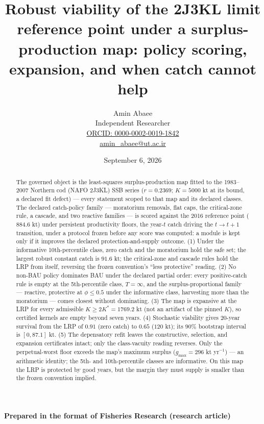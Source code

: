 \documentclass[11pt]{article}
\begin{document}
\title{Robust viability of the 2J3KL limit reference point under a surplus-production map: policy scoring, expansion, and when catch cannot help}
\author{Amin Abaee\\[0.35em]
{\small Independent Researcher}\\[0.55em]
{\small\href{https://orcid.org/0000-0002-0019-1842}{ORCID: 0000-0002-0019-1842}}\\[0.3em]
{\small\href{mailto:amin\_abaee@ut.ac.ir}{amin\_abaee@ut.ac.ir}}}
\date{September 6, 2026}
\maketitle

{\centering\small \textbf{Prepared in the format of Fisheries Research (research article)}\par}

\begin{abstract}


The governed object is the least-squares surplus-production map fitted
to the 1983--2007 Northern cod (NAFO 2J3KL) SSB series (\(r = 0.2369\);
\(K = 5000\) kt at its bound, a declared fit defect) --- every statement
scoped to that map and its declared classes. The declared catch-policy
family --- moratorium removals, flat caps, the critical-zone rule, a
cascade, and two reactive families --- is scored against the 2016
reference point (\(884.6\) kt) under persistent productivity floors, the
year-\(t\) catch driving the \(t \to t+1\) transition, under a protocol
frozen before any score was computed: a module is kept only if it
improves the declared protection-and-supply outcome. (1) Under the
informative 10th-percentile class, zero catch and the moratorium hold
the safe set; the largest robust constant catch is \(91.6\) kt; the
critical-zone and cascade rules hold the LRP from itself, reversing the
frozen convention's ``less protective'' reading. (2) No non-BAU policy
dominates BAU under the declared partial order: every positive-catch
rule is empty at the 5th-percentile class, \(T=\infty\), and the
surplus-proportional family --- reactive, protective at \(\phi \le 0.5\)
under the informative class, harvesting more than the moratorium ---
comes closest without dominating. (3) The map is expansive at the LRP
for every admissible \(K \ge 2K^* = 1769.2\) kt (not an artifact of the
pinned \(K\)), so certified kernels are empty beyond seven years. (4)
Stochastic viability gives 20-year survival from the LRP of \(0.91\)
(zero catch) to \(0.65\) (\(120\) kt); its \(90\%\) bootstrap interval
is \([0, 87.1]\) kt. (5) The depensatory refit leaves the constructive,
selection, and expansion certificates intact; only the class-vacuity
reading reverses. Only the perpetual-worst floor exceeds the map's
maximum surplus (\(g_{\max} = 296\) kt yr\(^{-1}\)) --- an arithmetic
identity; the 5th- and 10th-percentile classes are informative. On this
map the LRP is protected by good years, but the margin they must supply
is smaller than the frozen convention implied.

\end{abstract}
\end{document}
